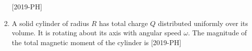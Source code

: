\documentclass[journal]{IEEEtran}
\begin{document}
\begin{enumerate}[start=27]
    \hfill{[2019-PH]}\\
\begin{enumerate}
\end{enumerate}
\item A solid cylinder of radius $R$ has total charge $Q$ distributed uniformly over its volume. It is rotating about its axis with angular speed $\omega$. The magnitude of the total magnetic moment of the cylinder is \hfill{[2019-PH]}\\
\begin{enumerate}
\end{enumerate}

\end{enumerate}
\end{document}
